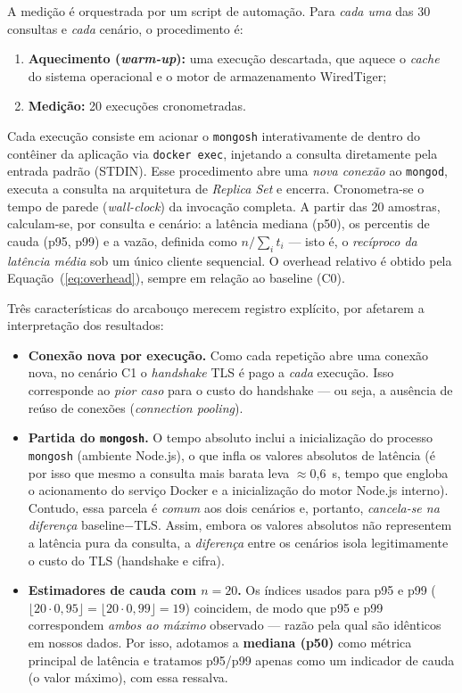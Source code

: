 \documentclass[12pt]{article}
\begin{document}
A medição é orquestrada por um script de automação. Para \emph{cada uma} das 30
consultas e \emph{cada} cenário, o procedimento é:

\begin{enumerate}
  \item \textbf{Aquecimento (\emph{warm-up}):} uma execução descartada, que
        aquece o \emph{cache} do sistema operacional e o motor de armazenamento
        WiredTiger;
  \item \textbf{Medição:} 20 execuções cronometradas.
\end{enumerate}

Cada execução consiste em acionar o \texttt{mongosh} interativamente de dentro do contêiner da aplicação via \texttt{docker exec}, injetando a consulta diretamente pela entrada padrão (STDIN). Esse procedimento abre uma \emph{nova conexão} ao \texttt{mongod}, executa a consulta na arquitetura de \emph{Replica Set} e encerra. Cronometra-se o tempo de parede (\emph{wall-clock}) da invocação completa. A partir das 20 amostras, calculam-se,
por consulta e cenário: a latência mediana (p50), os percentis de cauda (p95,
p99) e a vazão, definida como $n/\sum_i t_i$ --- isto é, o \emph{recíproco da
latência média} sob um único cliente sequencial. O overhead relativo é obtido
pela Equação~(\ref{eq:overhead}), sempre em relação ao baseline (C0).

Três características do arcabouço merecem registro explícito, por afetarem a
interpretação dos resultados:

\begin{itemize}
  \item \textbf{Conexão nova por execução.} Como cada repetição abre uma conexão
        nova, no cenário C1 o \emph{handshake} TLS é pago a \emph{cada} execução.
        Isso corresponde ao \emph{pior caso} para o custo do handshake --- ou
        seja, a ausência de reúso de conexões (\emph{connection pooling}).
  \item \textbf{Partida do \texttt{mongosh}.} O tempo absoluto inclui a
        inicialização do processo \texttt{mongosh} (ambiente Node.js), o que
        infla os valores absolutos de latência (é por isso que mesmo a consulta mais barata leva $\approx$0,6~s, tempo que engloba o acionamento do serviço Docker e a inicialização do motor Node.js interno). Contudo, essa parcela é \emph{comum}
        aos dois cenários e, portanto, \emph{cancela-se na diferença}
        baseline$-$TLS. Assim, embora os valores absolutos não representem a
        latência pura da consulta, a \emph{diferença} entre os cenários isola
        legitimamente o custo do TLS (handshake e cifra).
  \item \textbf{Estimadores de cauda com $n=20$.} Os índices usados para p95 e
        p99 ($\lfloor 20 \cdot 0{,}95 \rfloor = \lfloor 20 \cdot 0{,}99 \rfloor = 19$)
        coincidem, de modo que p95 e p99 correspondem \emph{ambos ao máximo}
        observado --- razão pela qual são idênticos em nossos dados. Por isso,
        adotamos a \textbf{mediana (p50)} como métrica principal de latência e
        tratamos p95/p99 apenas como um indicador de cauda (o valor máximo), com
        essa ressalva.
\end{itemize}
\end{document}
